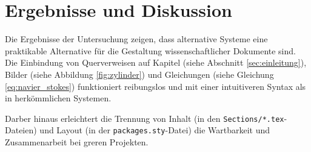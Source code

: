 \section{Ergebnisse und Diskussion}
\label{sec:ergebnisse}

Die Ergebnisse der Untersuchung zeigen, dass alternative Systeme eine praktikable Alternative für die Gestaltung wissenschaftlicher Dokumente sind. Die Einbindung von Querverweisen auf Kapitel (siehe Abschnitt \ref{sec:einleitung}), Bilder (siehe Abbildung \ref{fig:zylinder}) und Gleichungen (siehe Gleichung \ref{eq:navier_stokes}) funktioniert reibungslos und mit einer intuitiveren Syntax als in herkömmlichen Systemen.

Darber hinaus erleichtert die Trennung von Inhalt (in den \texttt{Sections/*.tex}-Dateien) und Layout (in der \texttt{packages.sty}-Datei) die Wartbarkeit und Zusammenarbeit bei greren Projekten.
